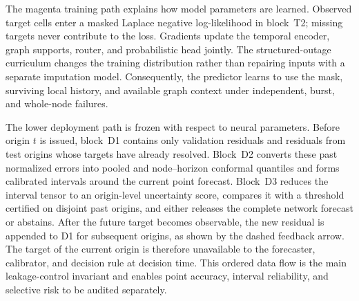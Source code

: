 \documentclass[preprint,12pt]{elsarticle}
\begin{document}
The magenta training path explains how model parameters are learned. Observed
target cells enter a masked Laplace negative log-likelihood in block~T2; missing
targets never contribute to the loss. Gradients update the temporal encoder,
graph supports, router, and probabilistic head jointly. The structured-outage
curriculum changes the training distribution rather than repairing inputs with
a separate imputation model. Consequently, the predictor learns to use the
mask, surviving local history, and available graph context under independent,
burst, and whole-node failures.

The lower deployment path is frozen with respect to neural parameters. Before
origin $t$ is issued, block~D1 contains only validation residuals and residuals
from test origins whose targets have already resolved. Block~D2 converts these
past normalized errors into pooled and node--horizon conformal quantiles and
forms calibrated intervals around the current point forecast. Block~D3 reduces
the interval tensor to an origin-level uncertainty score, compares it with a
threshold certified on disjoint past origins, and either releases the complete
network forecast or abstains. After the future target becomes observable, the
new residual is appended to D1 for subsequent origins, as shown by the dashed
feedback arrow. The target of the current origin is therefore unavailable to
the forecaster, calibrator, and decision rule at decision time. This ordered
data flow is the main leakage-control invariant and enables point accuracy,
interval reliability, and selective risk to be audited separately.
\end{document}
